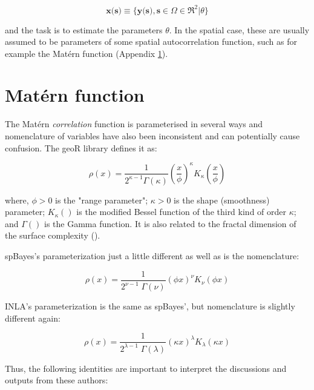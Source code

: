 \documentclass[letterpaper,portrait,11pt]{scrartcl}
\numberwithin{equation}{section}		%
\numberwithin{figure}{section}		%
\numberwithin{table}{section}				%
\begin{document}
\begin{appendices}
\begin{equation}
\textbf{x(s)} \equiv \{ \textbf{y(s)}, \textbf{s} \in \Omega \in \Re^2 | \theta \}
\end{equation}

and the task is to estimate the parameters $\theta$. In the spatial case, these are usually assumed to be parameters of some spatial autocorrelation function, such as for example the Mat\'{e}rn function (Appendix \ref{sec:matern}).


\section{Mat\'{e}rn function}
\label{sec:matern}

The Mat\'{e}rn \textit{correlation} function is parameterised in several ways and nomenclature of variables have also been inconsistent and can potentially cause confusion. The geoR library \parencite{diggle:2007, ribeiro:2001} defines it as:

\begin{equation}
    \rho(x) = \frac{1}{2^{\kappa-1} \Gamma(\kappa)}
    {\left( \frac{x}{\phi} \right)  }^{\kappa} K_{\kappa}\left( \frac{x}{\phi} \right)
\end{equation}

where, $\phi > 0$ is the "range parameter";  $\kappa > 0$ is the shape (smoothness) parameter; $K_{\kappa}()$ is the modified Bessel function of the third kind of order $\kappa$; and $\Gamma()$ is the Gamma function. It is also related to the fractal dimension of the surface complexity (\cite{Schepers:2002:fractals, constantine:1994}). 

spBayes's \parencite{finley:2007} parameterization just a little different as well as is the nomenclature:

\begin{equation}
\rho(x) = \frac{ 1 }{ 2^{\nu-1} \; \Gamma(\nu) }  \left( \phi x \right) ^{\nu} K_{\nu} \left( \phi x  \right) 
\end{equation}


INLA's \parencite{rinla:2015} parameterization is the same as spBayes', but nomenclature is slightly different again:

\begin{equation}
  \rho(x) = \frac{ 1 }{ 2^{\lambda-1} \; \Gamma(\lambda) }  \left( \kappa x \right) ^{\lambda} K_{\lambda} \left( \kappa x  \right) 
\end{equation}

Thus, the following identities are important to interpret the discussions and outputs from these authors:


\end{appendices}
\end{document}

